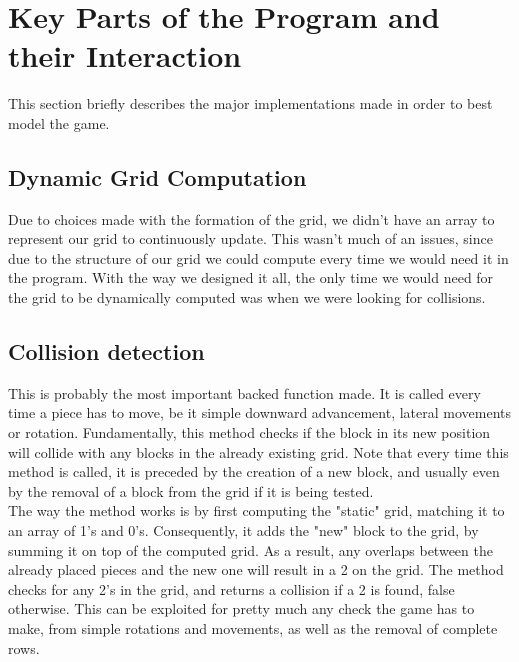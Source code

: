 
\section{Key Parts of the Program and their Interaction}
	This section briefly describes the major implementations made in order to best model the game.
	\subsection{Dynamic Grid Computation}
		Due to choices made with the formation of the grid, we didn't have an array to represent our grid to continuously update. This wasn't much of an issues, since due to the 
		structure of our grid we could compute every time we would need it in the program. With the way we designed it all, the only time we would need for the grid to be dynamically 
		computed was when we were looking for collisions.
	\subsection{Collision detection}
		This is probably the most important backed function made. It is called every time a piece has to move, be it simple downward advancement, lateral movements or rotation. Fundamentally,
		this method checks if the block in its new position will collide with any blocks in the already existing grid. Note that every time this method is called, it is preceded by the creation of a new 
		block, and usually even by the removal of a block from the grid if it is being tested. \\
		The way the method works is by first computing the "static" grid, matching it to an array of 1's and 0's. Consequently, it adds the "new" block to the grid, by summing it on top of the
		computed grid. As a result, any overlaps between the already placed pieces and the new one will result in a 2 on the grid. The method checks for any 2's in the grid, and returns a collision
		if a 2 is found, false otherwise. This can be exploited for pretty much any check the game has to make, from simple rotations and movements, as well as the removal of complete rows.
